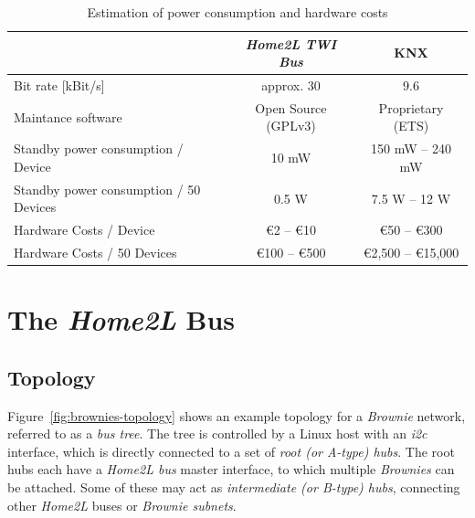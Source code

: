 \documentclass[12pt,english,parskip=half,headheight=19pt]{scrreprt}
\begin{document}
\begin{table}[ht]
  \centering
  \renewcommand{\arraystretch}{1.4}
  \begin{tabular}{l||c|c}
    & \textit{Home2L TWI Bus} & KNX \\
    \hline \hline
    Bit rate [kBit/s]
      & approx. 30            & 9.6 \\
    \hline Maintance software
      & Open Source (GPLv3) & Proprietary (ETS) \\
    \hline Standby power consumption / Device \footnotemark[1]
      & 10 mW      & 150 mW -- 240 mW \\
    \hline Standby power consumption / 50 Devices
      & 0.5 W      & 7.5 W -- 12 W \\
    \hline Hardware Costs / Device \footnotemark[2]
      & €2 -- €10     & €50 -- €300 \\
    \hline Hardware Costs / 50 Devices
      & €100 -- €500  & €2,500 -- €15,000
  \end{tabular}
  \caption[l]{Estimation of power consumption and hardware costs}
  \label{tab:brownies-costs}
\end{table}



\clearpage   %





\section{The \textit{Home2L} Bus}
\label{sec:brownies-bus}



\subsection{Topology}
\label{sec:brownies-bus-topology}

Figure~\ref{fig:brownies-topology} shows an example topology for a \textit{Brownie} network, referred to as a \textit{bus tree}. The tree is controlled by a Linux host with an \textit{i2c} interface, which is directly connected to a set of \textit{root (or A-type) hubs}. The root hubs each have a \textit{Home2L bus} master interface, to which multiple \textit{Brownies} can be attached. Some of these may act as \textit{intermediate (or B-type) hubs}, connecting other \textit{Home2L} buses or \textit{Brownie subnets}.
\end{document}
